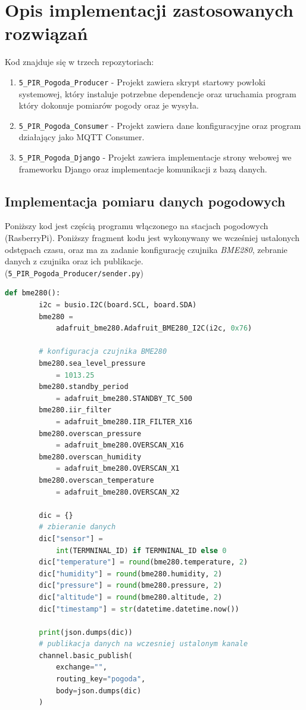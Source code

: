 \documentclass[12pt,a4paper]{article}
\begin{document}
    \section{Opis implementacji zastosowanych rozwiązań}
    Kod znajduje się w trzech repozytoriach:
    \begin{enumerate}
        \item \texttt{5\_PIR\_Pogoda\_Producer} - Projekt zawiera skrypt startowy powłoki systemowej, który instaluje potrzebne dependencje oraz uruchamia program który dokonuje pomiarów pogody oraz je wysyła.
        \item \texttt{5\_PIR\_Pogoda\_Consumer} - Projekt zawiera dane konfiguracyjne oraz program działający jako MQTT Consumer.
        \item \texttt{5\_PIR\_Pogoda\_Django} - Projekt zawiera implementacje strony webowej we frameworku Django oraz implementacje komunikacji z bazą danych.
    \end{enumerate}

    \pagebreak
    \subsection{Implementacja pomiaru danych pogodowych}
    Poniższy kod jest częścią programu włączonego na stacjach pogodowych (RasberryPi). Poniższy fragment kodu jest wykonywany we wcześniej ustalonych odstępach czasu, oraz ma za zadanie konfigurację czujnika \emph{BME280}, zebranie danych z czujnika oraz ich publikacje.\\(\texttt{5\_PIR\_Pogoda\_Producer/sender.py})
    \begin{lstlisting}[language=Python]
    def bme280():
        i2c = busio.I2C(board.SCL, board.SDA)
        bme280 =
            adafruit_bme280.Adafruit_BME280_I2C(i2c, 0x76)

        # konfiguracja czujnika BME280
        bme280.sea_level_pressure
            = 1013.25
        bme280.standby_period
            = adafruit_bme280.STANDBY_TC_500
        bme280.iir_filter
            = adafruit_bme280.IIR_FILTER_X16
        bme280.overscan_pressure
            = adafruit_bme280.OVERSCAN_X16
        bme280.overscan_humidity
            = adafruit_bme280.OVERSCAN_X1
        bme280.overscan_temperature
            = adafruit_bme280.OVERSCAN_X2

        dic = {}
        # zbieranie danych
        dic["sensor"] =
            int(TERMNINAL_ID) if TERMNINAL_ID else 0
        dic["temperature"] = round(bme280.temperature, 2)
        dic["humidity"] = round(bme280.humidity, 2)
        dic["pressure"] = round(bme280.pressure, 2)
        dic["altitude"] = round(bme280.altitude, 2)
        dic["timestamp"] = str(datetime.datetime.now())

        print(json.dumps(dic))
        # publikacja danych na wczesniej ustalonym kanale
        channel.basic_publish(
            exchange="",
            routing_key="pogoda",
            body=json.dumps(dic)
        )
    \end{lstlisting}
\end{document}
